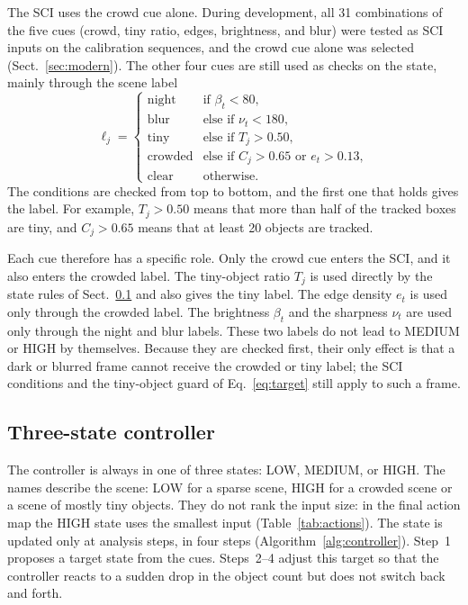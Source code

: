 \documentclass[pdflatex,sn-mathphys-num,iicol]{sn-jnl}
\begin{document}
The SCI uses the crowd cue alone. During development, all 31 combinations of
the five cues (crowd, tiny ratio, edges, brightness, and blur) were tested as
SCI inputs on the calibration sequences, and the crowd cue alone was selected
(Sect.~\ref{sec:modern}). The other four cues are still used as checks on the
state, mainly through the scene label
\begin{equation}
\ell_j=\begin{cases}
\text{night}   & \text{if } \beta_t<80,\\
\text{blur}    & \text{else if } \nu_t<180,\\
\text{tiny}    & \text{else if } T_j>0.50,\\
\text{crowded} & \text{else if } C_j>0.65 \text{ or } e_t>0.13,\\
\text{clear}   & \text{otherwise.}
\end{cases}
\label{eq:label}
\end{equation}
The conditions are checked from top to bottom, and the first one that holds
gives the label. For example, $T_j>0.50$ means that more than half of the
tracked boxes are tiny, and $C_j>0.65$ means that at least 20 objects are
tracked.

Each cue therefore has a specific role. Only the crowd cue enters the SCI,
and it also enters the crowded label. The tiny-object ratio $T_j$ is used directly by the state rules of
Sect.~\ref{sec:states} and also gives the tiny label. The edge density $e_t$
is used only through the crowded label. The brightness $\beta_t$ and the
sharpness $\nu_t$ are used only through the night and blur labels. These two
labels do not lead to MEDIUM or HIGH by themselves. Because they are checked
first, their only effect is that a dark or blurred frame cannot receive the
crowded or tiny label; the SCI conditions and the tiny-object guard of
Eq.~\eqref{eq:target} still apply to such a frame.

\subsection{Three-state controller}\label{sec:states}
The controller is always in one of three states: LOW, MEDIUM, or HIGH. The
names describe the scene: LOW for a sparse scene, HIGH for a crowded scene or
a scene of mostly tiny objects. They do not rank the input size: in the final
action map the HIGH state uses the smallest input (Table~\ref{tab:actions}).
The state is updated only at analysis steps, in four steps
(Algorithm~\ref{alg:controller}). Step~1 proposes a target state from the
cues. Steps~2--4 adjust this target so that the controller reacts to a sudden
drop in the object count but does not switch back and forth.
\end{document}
